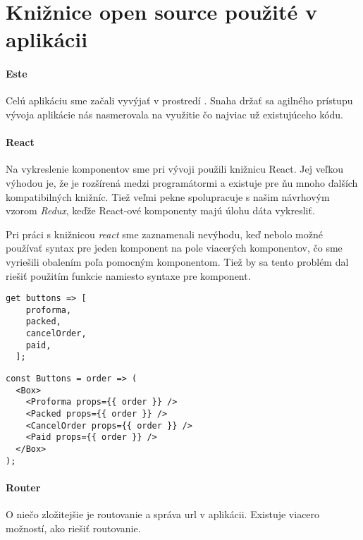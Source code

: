 \section{Knižnice open source použité v aplikácii}%

\paragraph{Este}
Celú aplikáciu sme začali vyvýjať v prostredí \cite[este]{Este}. Snaha držať sa agilného prístupu vývoja aplikácie nás nasmerovala na využitie čo najviac už existujúceho kódu. %
\TODO{}

\paragraph{React}
Na vykreslenie komponentov sme pri vývoji použili knižnicu React. Jej veľkou výhodou je, že je rozšírená medzi programátormi a existuje pre ňu mnoho ďalších kompatibilných knižníc. Tiež veľmi pekne spolupracuje s našim návrhovým vzorom \emph{Redux}, keďže React-ové komponenty majú úlohu dáta vykresliť.

Pri práci s knižnicou \emph{react} sme zaznamenali nevýhodu, keď nebolo možné používať syntax pre jeden komponent na pole viacerých komponentov, čo sme vyriešili obalením poľa pomocným komponentom. Tiež by sa tento problém dal riešiť použitím funkcie namiesto syntaxe pre komponent.

\TODO{}

\begin{lstlisting}[caption=Pole komponentov v Dart-e]
  get buttons => [
    proforma,
    packed,
    cancelOrder,
    paid,
  ];
\end{lstlisting}

\begin{lstlisting}[caption=Pole komponentov v JavaScripte s použitím knižnice React]
const Buttons = order => (
  <Box>
    <Proforma props={{ order }} />
    <Packed props={{ order }} />
    <CancelOrder props={{ order }} />
    <Paid props={{ order }} />
  </Box>
);
\end{lstlisting}



\paragraph{Router}%
O niečo zložitejšie je routovanie a správa url v aplikácii. Existuje viacero možností, ako riešiť routovanie. 

